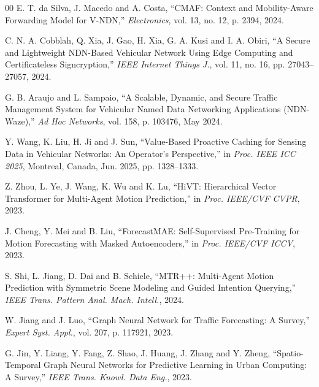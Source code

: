 \documentclass[journal]{IEEEtran}
\begin{document}
\begin{thebibliography}{00}
 E. T. da Silva, J. Macedo and A. Costa, ``CMAF: Context and Mobility-Aware Forwarding Model for V-NDN,'' \emph{Electronics}, vol. 13, no. 12, p. 2394, 2024.

 C. N. A. Cobblah, Q. Xia, J. Gao, H. Xia, G. A. Kusi and I. A. Obiri, ``A Secure and Lightweight NDN-Based Vehicular Network Using Edge Computing and Certificateless Signcryption,'' \emph{IEEE Internet Things J.}, vol. 11, no. 16, pp. 27043--27057, 2024.

 G. B. Araujo and L. Sampaio, ``A Scalable, Dynamic, and Secure Traffic Management System for Vehicular Named Data Networking Applications (NDN-Waze),'' \emph{Ad Hoc Networks}, vol. 158, p. 103476, May 2024.

 Y. Wang, K. Liu, H. Ji and J. Sun, ``Value-Based Proactive Caching for Sensing Data in Vehicular Networks: An Operator's Perspective,'' in \emph{Proc. IEEE ICC 2025}, Montreal, Canada, Jun. 2025, pp. 1328--1333.


 Z. Zhou, L. Ye, J. Wang, K. Wu and K. Lu, ``HiVT: Hierarchical Vector Transformer for Multi-Agent Motion Prediction,'' in \emph{Proc. IEEE/CVF CVPR}, 2023.

 J. Cheng, Y. Mei and B. Liu, ``ForecastMAE: Self-Supervised Pre-Training for Motion Forecasting with Masked Autoencoders,'' in \emph{Proc. IEEE/CVF ICCV}, 2023.

 S. Shi, L. Jiang, D. Dai and B. Schiele, ``MTR++: Multi-Agent Motion Prediction with Symmetric Scene Modeling and Guided Intention Querying,'' \emph{IEEE Trans. Pattern Anal. Mach. Intell.}, 2024.

 W. Jiang and J. Luo, ``Graph Neural Network for Traffic Forecasting: A Survey,'' \emph{Expert Syst. Appl.}, vol. 207, p. 117921, 2023.

 G. Jin, Y. Liang, Y. Fang, Z. Shao, J. Huang, J. Zhang and Y. Zheng, ``Spatio-Temporal Graph Neural Networks for Predictive Learning in Urban Computing: A Survey,'' \emph{IEEE Trans. Knowl. Data Eng.}, 2023.


\end{thebibliography}
\end{document}
